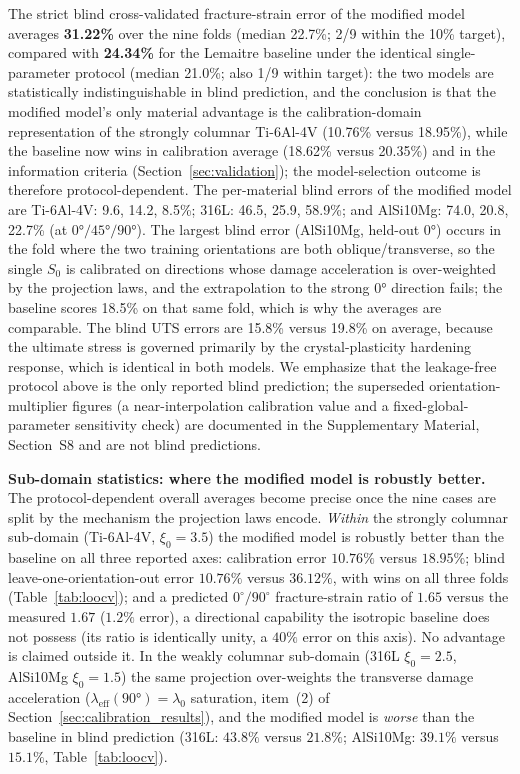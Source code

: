 The strict blind cross-validated fracture-strain error of the modified model averages \textbf{31.22\%} over the nine folds (median 22.7\%; 2/9 within the 10\% target), compared with \textbf{24.34\%} for the Lemaitre baseline under the identical single-parameter protocol (median 21.0\%; also 1/9 within target): the two models are statistically indistinguishable in blind prediction, and the conclusion is that the modified model's only material advantage is the calibration-domain representation of the strongly columnar Ti-6Al-4V (10.76\% versus 18.95\%), while the baseline now wins in calibration average (18.62\% versus 20.35\%) and in the information criteria (Section~\ref{sec:validation}); the model-selection outcome is therefore protocol-dependent. The per-material blind errors of the modified model are Ti-6Al-4V: 9.6, 14.2, 8.5\%; 316L: 46.5, 25.9, 58.9\%; and AlSi10Mg: 74.0, 20.8, 22.7\% (at $\ang{0}/\ang{45}/\ang{90}$). The largest blind error (AlSi10Mg, held-out $\ang{0}$) occurs in the fold where the two training orientations are both oblique/transverse, so the single $S_0$ is calibrated on directions whose damage acceleration is over-weighted by the projection laws, and the extrapolation to the strong $\ang{0}$ direction fails; the baseline scores 18.5\% on that same fold, which is why the averages are comparable. The blind UTS errors are 15.8\% versus 19.8\% on average, because the ultimate stress is governed primarily by the crystal-plasticity hardening response, which is identical in both models. We emphasize that the leakage-free protocol above is the only reported blind prediction; the superseded orientation-multiplier figures (a near-interpolation calibration value and a fixed-global-parameter sensitivity check) are documented in the Supplementary Material, Section~S8 and are not blind predictions.



\textbf{Sub-domain statistics: where the modified model is robustly better.}
The protocol-dependent overall averages become precise once the nine cases are split by the mechanism the projection laws encode. \emph{Within} the strongly columnar sub-domain (Ti-6Al-4V, $\xi_0 = 3.5$) the modified model is robustly better than the baseline on all three reported axes: calibration error $10.76\%$ versus $18.95\%$; blind leave-one-orientation-out error $10.76\%$ versus $36.12\%$, with wins on all three folds (Table~\ref{tab:loocv}); and a predicted $0^\circ/90^\circ$ fracture-strain ratio of $1.65$ versus the measured $1.67$ ($1.2\%$ error), a directional capability the isotropic baseline does not possess (its ratio is identically unity, a $40\%$ error on this axis). No advantage is claimed outside it. In the weakly columnar sub-domain (316L $\xi_0 = 2.5$, AlSi10Mg $\xi_0 = 1.5$) the same projection over-weights the transverse damage acceleration ($\lambda_{\mathrm{eff}}(\ang{90}) = \lambda_0$ saturation, item~(2) of Section~\ref{sec:calibration_results}), and the modified model is \emph{worse} than the baseline in blind prediction (316L: $43.8\%$ versus $21.8\%$; AlSi10Mg: $39.1\%$ versus $15.1\%$, Table~\ref{tab:loocv}).

